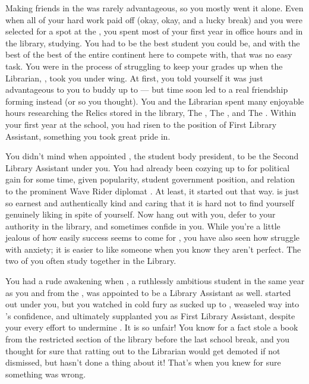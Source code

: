 \documentclass[char]{GL2020}
\begin{document}
Making friends in the \pFarm{} was rarely advantageous, so you mostly went it alone. Even when all of your hard work paid off (okay, okay, and a lucky break) and you were selected for a spot at the \pSchool{}, you spent most of your first year in office hours and in the library, studying. You had to be the best student you could be, and with the best of the best of the entire continent here to compete with, that was no easy task. You were in the process of struggling to keep your grades up when the Librarian, \cLibrarian{\intro}, took you under \cLibrarian{\their} wing. At first, you told yourself it was just advantageous to you to buddy up to \cLibrarian{\them} — but time soon led to a real friendship forming instead (or so you thought). You and the Librarian spent many enjoyable hours researching the Relics stored in the library, The \iLariat{}, The \iNet{}, and The \iScythe{}. Within your first year at the school, you had risen to the position of First Library Assistant, something you took great pride in.

You didn't mind when \cLibrarian{} appointed \cPresident{\intro}, the student body president, to be the Second Library Assistant under you. You had already been cozying up to \cPresident{} for political gain for some time, given \cPresident{\their} popularity, student government position, and relation to the prominent Wave Rider diplomat \cHeadDiplomat{\intro}. At least, it started out that way. \cPresident{} is just so earnest and authentically kind and caring that it is hard not to find yourself genuinely liking \cPresident{\them} in spite of yourself. Now \cPresident{\they} hang\cPresident{\verbs} out with you, defer\cPresident{\verbs} to your authority in the library, and sometimes confide\cPresident{\verbs} in you. While you're a little jealous of how easily success seems to come for \cPresident{}, you have also seen how \cPresident{\they} struggle\cPresident{\verbs} with anxiety; it is easier to like someone when you know they aren't perfect. The two of you often study together in the Library.

You had a rude awakening when \cAmbition{\intro}, a ruthlessly ambitious student in the same year as you and from the \pTech{}, was appointed to be a Library Assistant as well. \cAmbition{\They} started out under you, but you watched in cold fury as \cAmbition{\they} sucked up to \cLibrarian{}, weaseled \cAmbition{\their} way into \cLibrarian{}’s confidence, and ultimately supplanted you as First Library Assistant, despite your every effort to undermine \cAmbition{\them}. It is so unfair! You know for a fact \cAmbition{} stole a book from the restricted section of the library before the last school break, and you thought for sure that ratting \cAmbition{\them} out to the Librarian would get \cAmbition{\them} demoted if not dismissed, but \cLibrarian{} hasn't done a thing about it! That's when you knew for sure something was wrong. 
\end{document}
